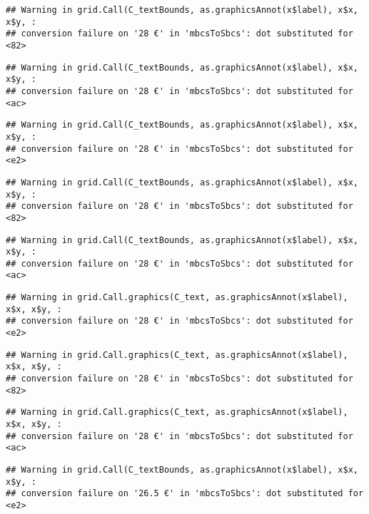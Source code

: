 \documentclass[
]{article}
\begin{document}
\begin{verbatim}
## Warning in grid.Call(C_textBounds, as.graphicsAnnot(x$label), x$x, x$y, :
## conversion failure on '28 €' in 'mbcsToSbcs': dot substituted for <82>
\end{verbatim}

\begin{verbatim}
## Warning in grid.Call(C_textBounds, as.graphicsAnnot(x$label), x$x, x$y, :
## conversion failure on '28 €' in 'mbcsToSbcs': dot substituted for <ac>
\end{verbatim}

\begin{verbatim}
## Warning in grid.Call(C_textBounds, as.graphicsAnnot(x$label), x$x, x$y, :
## conversion failure on '28 €' in 'mbcsToSbcs': dot substituted for <e2>
\end{verbatim}

\begin{verbatim}
## Warning in grid.Call(C_textBounds, as.graphicsAnnot(x$label), x$x, x$y, :
## conversion failure on '28 €' in 'mbcsToSbcs': dot substituted for <82>
\end{verbatim}

\begin{verbatim}
## Warning in grid.Call(C_textBounds, as.graphicsAnnot(x$label), x$x, x$y, :
## conversion failure on '28 €' in 'mbcsToSbcs': dot substituted for <ac>
\end{verbatim}

\begin{verbatim}
## Warning in grid.Call.graphics(C_text, as.graphicsAnnot(x$label), x$x, x$y, :
## conversion failure on '28 €' in 'mbcsToSbcs': dot substituted for <e2>
\end{verbatim}

\begin{verbatim}
## Warning in grid.Call.graphics(C_text, as.graphicsAnnot(x$label), x$x, x$y, :
## conversion failure on '28 €' in 'mbcsToSbcs': dot substituted for <82>
\end{verbatim}

\begin{verbatim}
## Warning in grid.Call.graphics(C_text, as.graphicsAnnot(x$label), x$x, x$y, :
## conversion failure on '28 €' in 'mbcsToSbcs': dot substituted for <ac>
\end{verbatim}

\begin{verbatim}
## Warning in grid.Call(C_textBounds, as.graphicsAnnot(x$label), x$x, x$y, :
## conversion failure on '26.5 €' in 'mbcsToSbcs': dot substituted for <e2>
\end{verbatim}
\end{document}
